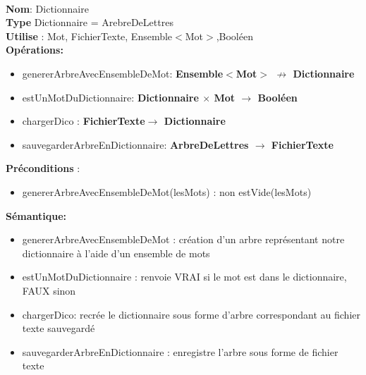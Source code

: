 \documentclass{article}
\begin{document}
    \noindent
    \\
    \textbf{Nom}: Dictionnaire\\
    \textbf{Type} Dictionnaire = ArebreDeLettres \\
    \textbf{Utilise} : Mot, FichierTexte, Ensemble$<$Mot$>$,Booléen\\
    \textbf{Opérations:} \begin{itemize}[label=$\ $, leftmargin=2cm, itemsep=0cm]
        \item genererArbreAvecEnsembleDeMot: \textbf{Ensemble$<$Mot$>$ $\nrightarrow $ Dictionnaire}
        \item estUnMotDuDictionnaire: \textbf{Dictionnaire $\times$ Mot $\rightarrow $ Booléen}
        \item chargerDico : \textbf{FichierTexte$ \rightarrow$ Dictionnaire}
        \item sauvegarderArbreEnDictionnaire: \textbf{ArbreDeLettres $\rightarrow$ FichierTexte}
        
    \end{itemize}
    \textbf{Préconditions} :
    \begin{itemize}[label=$\ $, leftmargin=2cm, itemsep=0cm]
     \item genererArbreAvecEnsembleDeMot(lesMots) : non estVide(lesMots)
     \end{itemize}

    \textbf{Sémantique: }\begin{itemize}[label=$\- $, leftmargin=2cm, itemsep=0cm]
        \item genererArbreAvecEnsembleDeMot : création d'un arbre représentant notre dictionnaire à l'aide d'un ensemble de mots
        \item estUnMotDuDictionnaire : renvoie VRAI si le mot est dans le dictionnaire, FAUX sinon
        \item chargerDico: recrée le dictionnaire sous forme d'arbre correspondant au fichier texte sauvegardé
        \item sauvegarderArbreEnDictionnaire : enregistre l'arbre sous forme de fichier texte
    \end{itemize}
\end{document}
